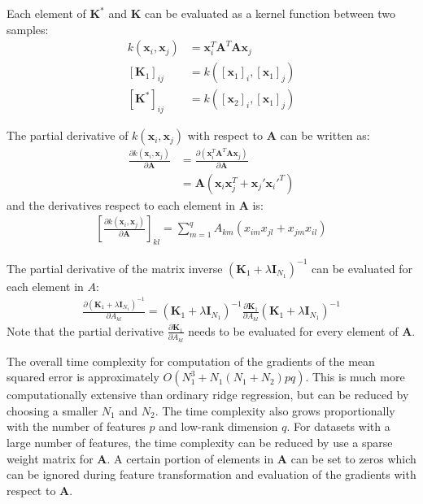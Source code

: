 \documentclass[a4paper,11pt]{article}
\begin{document}
Each element of $\mathbf{K}^{*}$ and $\mathbf{K}$ can be evaluated as a kernel function between two samples: 
\begin{align}
k(\mathbf{x}_i, \mathbf{x}_j ) &= \mathbf{x}_i^{T} \mathbf{A}^{T} \mathbf{A} \mathbf{x}_j \\
[\mathbf{K}_1]_{ij} &= k([\mathbf{x}_1]_i, [\mathbf{x}_1]_j ) \\
[\mathbf{K}^{*}]_{ij} &= k([\mathbf{x}_2]_i, [\mathbf{x}_1]_j )
\end{align}

The partial derivative of $k(\mathbf{x}_i, \mathbf{x}_j )$ with respect to $\mathbf{A}$ can be written as:
\begin{align}
\frac{\partial k(\mathbf{x}_i, \mathbf{x}_j )}{\partial \mathbf{A}} &= \frac{\partial (\mathbf{x}_i^{T} \mathbf{A}^{T} \mathbf{A} \mathbf{x}_j)} {\partial \mathbf{A}} \\
&= \mathbf{A}(\mathbf{x}_i \mathbf{x}_j^{T} + \mathbf{x}_j' \mathbf{x}_i'^{T})
\end{align}
and the derivatives respect to each element in $\mathbf{A}$ is:
\begin{align}
\left[ \frac{\partial k(\mathbf{x}_i, \mathbf{x}_j )}{\partial \mathbf{A}} \right]_{kl} = \sum_{m=1}^{q} A_{km} (x_{im} x_{jl} + x_{jm} x_{il})
\end{align}

The partial derivative of the matrix inverse $(\mathbf{K}_1 + \lambda \mathbf{I}_{N_1})^{-1}$ can be evaluated for each element in $A$:
\begin{align}
\frac{\partial (\mathbf{K}_1 + \lambda \mathbf{I}_{N_1})^{-1}}{\partial A_{kl}} = (\mathbf{K}_1 + \lambda \mathbf{I}_{N_1})^{-1} \frac{\partial \mathbf{K}_1}{\partial A_{kl}} (\mathbf{K}_1 + \lambda \mathbf{I}_{N_1})^{-1}
\end{align}
Note that the partial derivative $\frac{\partial \mathbf{K}_1}{\partial A_{kl}}$ needs to be evaluated for every element of $\mathbf{A}$.

The overall time complexity for computation of the gradients of the mean squared error is approximately $O(N_1^3 + N_1 (N_1 + N_2) pq)$.
This is much more computationally extensive than ordinary ridge regression, but can be reduced by choosing a smaller $N_1$ and $N_2$.
The time complexity also grows proportionally with the number of features $p$ and low-rank dimension $q$.
For datasets with a large number of features, the time complexity can be reduced by use a sparse weight matrix for $\mathbf{A}$.
A certain portion of elements in $\mathbf{A}$ can be set to zeros which can be ignored during feature transformation and evaluation of the gradients with respect to $\mathbf{A}$.
\end{document}
